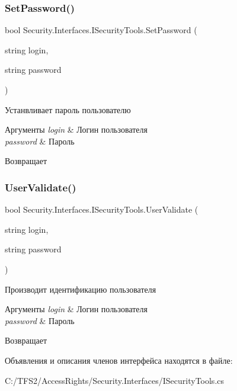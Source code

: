 \subsubsection{\texorpdfstring{Set\+Password()}{SetPassword()}}
{\footnotesize\ttfamily bool Security.\+Interfaces.\+I\+Security\+Tools.\+Set\+Password (\begin{DoxyParamCaption}\item[{string}]{login,  }\item[{string}]{password }\end{DoxyParamCaption})}



Устанвливает пароль пользователю 


\begin{DoxyParams}{Аргументы}
{\em login} & Логин пользователя\\
\hline
{\em password} & Пароль\\
\hline
\end{DoxyParams}
\begin{DoxyReturn}{Возвращает}

\end{DoxyReturn}
\mbox{\label{interface_security_1_1_interfaces_1_1_i_security_tools_a26ab5bc4b978b996a6442968289467bb}} 
\subsubsection{\texorpdfstring{User\+Validate()}{UserValidate()}}
{\footnotesize\ttfamily bool Security.\+Interfaces.\+I\+Security\+Tools.\+User\+Validate (\begin{DoxyParamCaption}\item[{string}]{login,  }\item[{string}]{password }\end{DoxyParamCaption})}



Производит идентификацию пользователя 


\begin{DoxyParams}{Аргументы}
{\em login} & Логин пользователя\\
\hline
{\em password} & Пароль\\
\hline
\end{DoxyParams}
\begin{DoxyReturn}{Возвращает}

\end{DoxyReturn}


Объявления и описания членов интерфейса находятся в файле\+:\begin{DoxyCompactItemize}
\item 
C\+:/\+T\+F\+S2/\+Access\+Rights/\+Security.\+Interfaces/I\+Security\+Tools.\+cs\end{DoxyCompactItemize}
